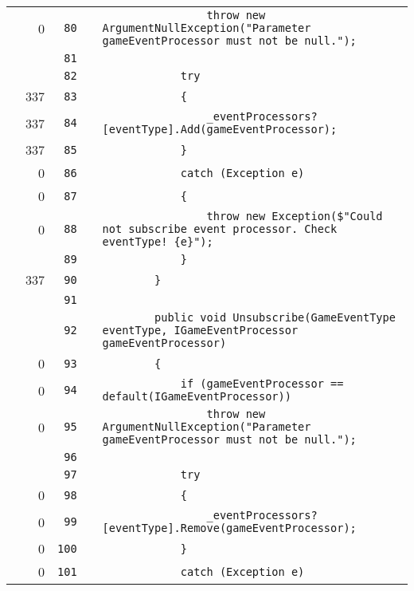 \documentclass[a4paper,landscape,10pt]{article}
\begin{document}
\begin{longtable}[l]{lrrll}
\cellcolor{red} & 0 & \verb~80~ & & \verb~                throw new ArgumentNullException("Parameter gameEventProcessor must not be null.");~\\
\cellcolor{gray} &  & \verb~81~ & & \verb~~\\
\cellcolor{gray} &  & \verb~82~ & & \verb~            try~\\
\cellcolor{green} & 337 & \verb~83~ & & \verb~            {~\\
\cellcolor{orange} & 337 & \verb~84~ & & \verb~                _eventProcessors?[eventType].Add(gameEventProcessor);~\\
\cellcolor{green} & 337 & \verb~85~ & & \verb~            }~\\
\cellcolor{red} & 0 & \verb~86~ & & \verb~            catch (Exception e)~\\
\cellcolor{red} & 0 & \verb~87~ & & \verb~            {~\\
\cellcolor{red} & 0 & \verb~88~ & & \verb~                throw new Exception($"Could not subscribe event processor. Check eventType! {e}");~\\
\cellcolor{gray} &  & \verb~89~ & & \verb~            }~\\
\cellcolor{green} & 337 & \verb~90~ & & \verb~        }~\\
\cellcolor{gray} &  & \verb~91~ & & \verb~~\\
\cellcolor{gray} &  & \verb~92~ & & \verb~        public void Unsubscribe(GameEventType eventType, IGameEventProcessor gameEventProcessor)~\\
\cellcolor{red} & 0 & \verb~93~ & & \verb~        {~\\
\cellcolor{red} & 0 & \verb~94~ & & \verb~            if (gameEventProcessor == default(IGameEventProcessor))~\\
\cellcolor{red} & 0 & \verb~95~ & & \verb~                throw new ArgumentNullException("Parameter gameEventProcessor must not be null.");~\\
\cellcolor{gray} &  & \verb~96~ & & \verb~~\\
\cellcolor{gray} &  & \verb~97~ & & \verb~            try~\\
\cellcolor{red} & 0 & \verb~98~ & & \verb~            {~\\
\cellcolor{red} & 0 & \verb~99~ & & \verb~                _eventProcessors?[eventType].Remove(gameEventProcessor);~\\
\cellcolor{red} & 0 & \verb~100~ & & \verb~            }~\\
\cellcolor{red} & 0 & \verb~101~ & & \verb~            catch (Exception e)~\\

\end{longtable}
\end{document}

